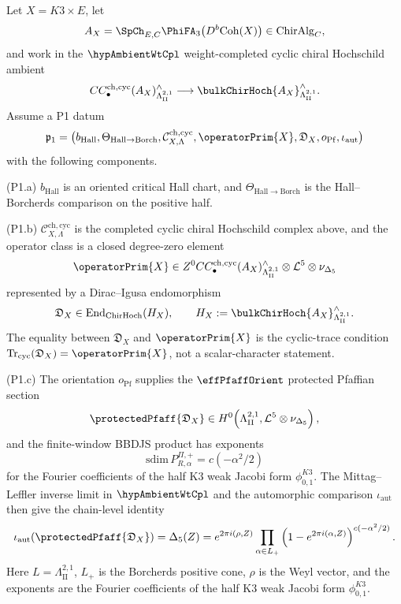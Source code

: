\begin{theorem}
\label{thm:k3-borcherds-operator-square}
Let \(X=K3\times E\), let
\[
 A_X=
 {\SpCh}_{E,C}\PhiFA_{3}\bigl(D^{b}\mathrm{Coh}(X)\bigr)
 \in \mathrm{ChirAlg}_{C},
\]
and work in the \(\hypAmbientWtCpl\) weight-completed cyclic chiral
Hochschild ambient
\[
 CC^{\mathrm{ch,cyc}}_{\bullet}(A_X)^{\wedge}_{\Lambda^{2,1}_{\mathrm{II}}}
 \longrightarrow
 \bulkChirHoch{A_X}^{\wedge}_{\Lambda^{2,1}_{\mathrm{II}}}.
\]
Assume a P1 datum
\[
\mathfrak p_1=\bigl(
b_{\mathrm{Hall}},\Theta_{\mathrm{Hall}\to\mathrm{Borch}},
\mathcal C^{\mathrm{ch,cyc}}_{X,\Lambda},
\operatorPrim{X},\mathfrak D_X,o_{\mathrm{Pf}},\iota_{\mathrm{aut}}
\bigr)
\]
with the following components.

\textup{(P1.a)}  \(b_{\mathrm{Hall}}\) is an oriented critical Hall
chart, and
\(\Theta_{\mathrm{Hall}\to\mathrm{Borch}}\) is the
Hall--Borcherds comparison on the positive half.

\textup{(P1.b)}  \(\mathcal C^{\mathrm{ch,cyc}}_{X,\Lambda}\) is the
completed cyclic chiral Hochschild complex above, and the operator class
is a closed degree-zero element
\[
 \operatorPrim{X}\in
 Z^{0}CC^{\mathrm{ch,cyc}}_{\bullet}(A_X)^{\wedge}_{\Lambda^{2,1}_{\mathrm{II}}}
 \otimes \mathcal L^{5}\otimes\nu_{\Delta_5}
\]
represented by a Dirac--Igusa endomorphism
\[
 \mathfrak D_X
 \in
 \operatorname{End}_{\mathrm{ChirHoch}}(H_X),
 \qquad
 H_X:=\bulkChirHoch{A_X}^{\wedge}_{\Lambda^{2,1}_{\mathrm{II}}}.
\]
The equality between \(\mathfrak D_X\) and \(\operatorPrim{X}\) is the
cyclic-trace condition \(\mathrm{Tr}_{\mathrm{cyc}}(\mathfrak D_X)
=\operatorPrim{X}\), not a scalar-character statement.

\textup{(P1.c)}  The orientation \(o_{\mathrm{Pf}}\) supplies the
\(\effPfaffOrient\) protected Pfaffian section
\[
 \protectedPfaff{\mathfrak D_X}
 \in
 H^0\!\left(
 \Lambda^{2,1}_{\mathrm{II}},
 \mathcal L^{5}\otimes\nu_{\Delta_5}
 \right),
\]
and the finite-window BBDJS product has exponents
\[
\mathrm{sdim}\,P^{\Pi,+}_{R,\alpha}=c(-\alpha^2/2)
\]
for the Fourier coefficients of the half K3 weak Jacobi form
\(\phi_{0,1}^{K3}\).  The Mittag--Leffler inverse limit in
\(\hypAmbientWtCpl\) and the automorphic comparison
\(\iota_{\mathrm{aut}}\) then give the chain-level identity
\begin{equation}
\label{eq:k3-borcherds-operator-pfaffian}
 \iota_{\mathrm{aut}}\!\left(\protectedPfaff{\mathfrak D_X}\right)
 =
 \Delta_5(Z)
 =
 e^{2\pi i(\rho,Z)}
 \prod_{\alpha\in L_{+}}
 \left(1-e^{2\pi i(\alpha,Z)}\right)^{c(-\alpha^{2}/2)} .
\end{equation}
Here \(L=\Lambda^{2,1}_{\mathrm{II}}\), \(L_{+}\) is the Borcherds
positive cone, \(\rho\) is the Weyl vector, and the exponents are the
Fourier coefficients of the half K3 weak Jacobi form
\(\phi_{0,1}^{K3}\).


\end{theorem}
